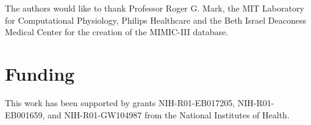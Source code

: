 \documentclass{elsart}
\begin{document}


\begin{ack}
The authors would like to thank Professor Roger G. Mark, the MIT Laboratory for Computational Physiology, Philips Healthcare and the Beth Israel Deaconess Medical Center for the creation of the MIMIC-III database.%
\end{ack}

\section*{Funding}

This work has been supported by grants NIH-R01-EB017205, NIH-R01-EB001659, and NIH-R01-GW104987 from the National Institutes of Health.%




\end{document}
